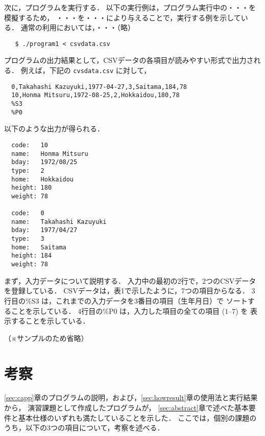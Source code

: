 次に，プログラムを実行する．
以下の実行例は，プログラム実行中の・・・を模擬するため，
・・・を・・・により与えることで，実行する例を示している．
通常の利用においては，・・・（略）

{\fontsize{10pt}{11pt} \selectfont
 \begin{verbatim}
   $ ./program1 < csvdata.csv
 \end{verbatim}
}

プログラムの出力結果として，CSVデータの各項目が読みやすい形式で出力される．
例えば，下記の \verb|cvsdata.csv| に対して，

{\fontsize{10pt}{11pt} \selectfont
 \begin{verbatim}
  0,Takahashi Kazuyuki,1977-04-27,3,Saitama,184,78
  10,Honma Mitsuru,1972-08-25,2,Hokkaidou,180,78
  %S3
  %P0
 \end{verbatim}
}

\noindent %
以下のような出力が得られる．

{\fontsize{10pt}{11pt} \selectfont
 \begin{verbatim}
  code:   10
  name:   Honma Mitsuru
  bday:   1972/08/25
  type:   2
  home:   Hokkaidou
  height: 180
  weight: 78

  code:   0
  name:   Takahashi Kazuyuki
  bday:   1977/04/27
  type:   3
  home:   Saitama
  height: 184
  weight: 78
 \end{verbatim}
}

まず，入力データについて説明する．
入力中の最初の2行で，2つのCSVデータを登録している．
CSVデータは，表1で示したように，7つの項目からなる．
3行目の\%S3 は，これまでの入力データを3番目の項目（生年月日）で
ソートすることを示している．
4行目の\%P0 は，入力した項目の全ての項目 ($1$--$7$) を
表示することを示している．

（※サンプルのため省略）




\section{考察}

\ref{sec:capp}章のプログラムの説明，および，\ref{sec:howresult}章の使用法と実行結果から，
演習課題として作成したプログラムが，
\ref{sec:abstract}章で述べた基本要件と基本仕様のいずれも満たしていることを示した．
ここでは，個別の課題のうち，以下の3つの項目について，考察を述べる．

